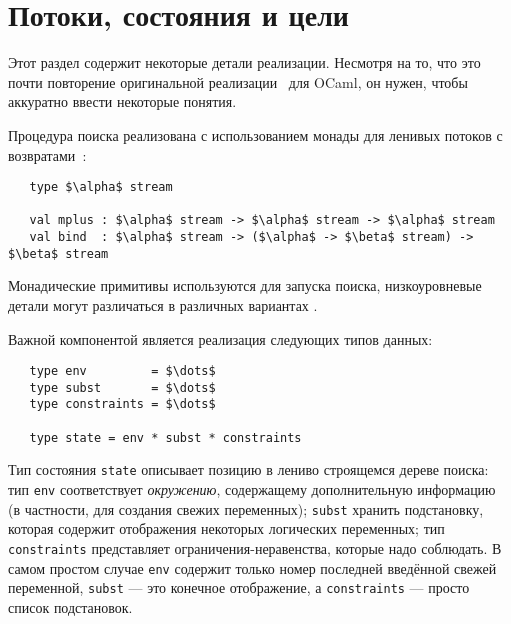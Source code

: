 
\section{Потоки, состояния и цели}
\label{sec:goals}

Этот раздел содержит некоторые детали  реализации.
Несмотря на то, что это почти повторение оригинальной реализации~\cite{MicroKanren, CKanren} для OCaml, он нужен, чтобы аккуратно ввести некоторые понятия.

Процедура поиска реализована с использованием монады для ленивых потоков с возвратами~\cite{KiselyovBacktracking}:

\begin{lstlisting}
   type $\alpha$ stream

   val mplus : $\alpha$ stream -> $\alpha$ stream -> $\alpha$ stream
   val bind  : $\alpha$ stream -> ($\alpha$ -> $\beta$ stream) -> $\beta$ stream
\end{lstlisting}

\noindent Монадические примитивы используются для запуска поиска, низкоуровневые детали могут различаться в  различных вариантах \miniKanren.

Важной компонентой является реализация следующих типов данных:

\begin{lstlisting}
   type env         = $\dots$
   type subst       = $\dots$
   type constraints = $\dots$

   type state = env * subst * constraints
\end{lstlisting}
Тип состояния \lstinline|state| описывает позицию в лениво строящемся дереве поиска:
тип \lstinline|env| соответствует  \emph{окружению}, содержащему дополнительную информацию (в частности, для создания свежих переменных);
\lstinline|subst| хранить подстановку, которая содержит отображения некоторых логических переменных;
тип \lstinline|constraints| представляет ограничения-неравенства, которые надо соблюдать.
В самом простом случае \lstinline|env| содержит только номер последней введённой свежей переменной, \lstinline|subst| --- это конечное отображение, а \lstinline|constraints| --- просто список подстановок.

